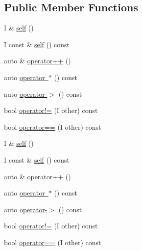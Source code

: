 \subsection*{Public Member Functions}
\begin{DoxyCompactItemize}
\item 
I \& \mbox{\hyperlink{structrah_1_1iterator__facade_3_01_i_00_01_r_00_01std_1_1forward__iterator__tag_01_4_a251df6fed6851bf7c6e5a37943d2bbdb}{self}} ()
\item 
I const  \& \mbox{\hyperlink{structrah_1_1iterator__facade_3_01_i_00_01_r_00_01std_1_1forward__iterator__tag_01_4_ab4e8c072a2c2058660886dba347b0e78}{self}} () const
\item 
auto \& \mbox{\hyperlink{structrah_1_1iterator__facade_3_01_i_00_01_r_00_01std_1_1forward__iterator__tag_01_4_a12486875e5b6fb93363408b9680dba64}{operator++}} ()
\item 
auto \mbox{\hyperlink{structrah_1_1iterator__facade_3_01_i_00_01_r_00_01std_1_1forward__iterator__tag_01_4_abd064784607e07a4fd444ce8ceb224ab}{operator $\ast$}} () const
\item 
auto \mbox{\hyperlink{structrah_1_1iterator__facade_3_01_i_00_01_r_00_01std_1_1forward__iterator__tag_01_4_a1fedf1529cf892522c1a73169b10936a}{operator-\/$>$}} () const
\item 
bool \mbox{\hyperlink{structrah_1_1iterator__facade_3_01_i_00_01_r_00_01std_1_1forward__iterator__tag_01_4_ae6487405e0a877ee7c9e9fb6a27d7158}{operator!=}} (I other) const
\item 
bool \mbox{\hyperlink{structrah_1_1iterator__facade_3_01_i_00_01_r_00_01std_1_1forward__iterator__tag_01_4_a3800bc53c7e3d504836bd9b125ae4600}{operator==}} (I other) const
\item 
I \& \mbox{\hyperlink{structrah_1_1iterator__facade_3_01_i_00_01_r_00_01std_1_1forward__iterator__tag_01_4_a251df6fed6851bf7c6e5a37943d2bbdb}{self}} ()
\item 
I const  \& \mbox{\hyperlink{structrah_1_1iterator__facade_3_01_i_00_01_r_00_01std_1_1forward__iterator__tag_01_4_ab4e8c072a2c2058660886dba347b0e78}{self}} () const
\item 
auto \& \mbox{\hyperlink{structrah_1_1iterator__facade_3_01_i_00_01_r_00_01std_1_1forward__iterator__tag_01_4_a12486875e5b6fb93363408b9680dba64}{operator++}} ()
\item 
auto \mbox{\hyperlink{structrah_1_1iterator__facade_3_01_i_00_01_r_00_01std_1_1forward__iterator__tag_01_4_abd064784607e07a4fd444ce8ceb224ab}{operator $\ast$}} () const
\item 
auto \mbox{\hyperlink{structrah_1_1iterator__facade_3_01_i_00_01_r_00_01std_1_1forward__iterator__tag_01_4_a1fedf1529cf892522c1a73169b10936a}{operator-\/$>$}} () const
\item 
bool \mbox{\hyperlink{structrah_1_1iterator__facade_3_01_i_00_01_r_00_01std_1_1forward__iterator__tag_01_4_ae6487405e0a877ee7c9e9fb6a27d7158}{operator!=}} (I other) const
\item 
bool \mbox{\hyperlink{structrah_1_1iterator__facade_3_01_i_00_01_r_00_01std_1_1forward__iterator__tag_01_4_a3800bc53c7e3d504836bd9b125ae4600}{operator==}} (I other) const
\end{DoxyCompactItemize}


